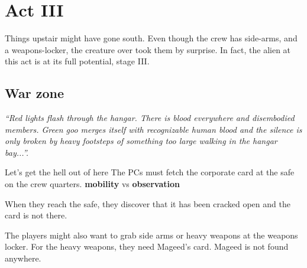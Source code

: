 \chapter{Act III}





\begin{rpg-commentbox}{}
    
    Things upstair might have gone south. Even though the crew has side-arms, and a weapons-locker, the creature over took them by surprise. In fact, the alien at this act is at its full potential, stage III. 

\end{rpg-commentbox}    



\section{War zone}



\begin{rpg-commentbox}{}
    
    \textit{
    ``Red lights flash through the hangar. There is blood everywhere and disembodied members. Green goo merges itself with recognizable human blood and the silence is only broken by heavy footsteps of something too large walking in the hangar bay...''.
    } 

    \medskip
\end{rpg-commentbox}    



\begin{rpg-commentbox}{Let's get the hell out of here}
   The PCs must fetch the corporate card at the safe on the crew quarters. \textbf{mobility} vs \textbf{observation}

   When they reach the safe, they discover that it has been cracked open and the card is not there.

   \medskip

    The players might also want to grab side arms or heavy weapons at the weapons locker. For the heavy weapons, they need Mageed's card.
    Mageed is not found anywhere.
\end{rpg-commentbox}



